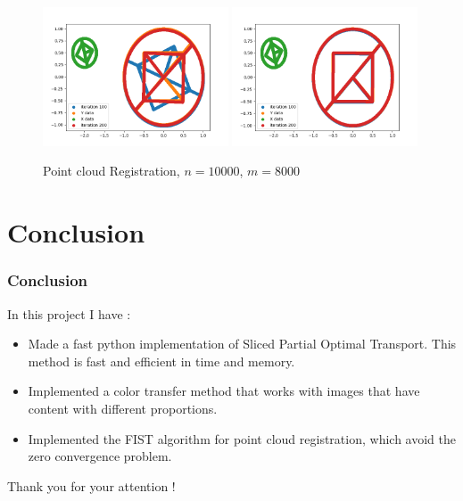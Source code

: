 \documentclass[11pt]{beamer}
\begin{document}
\begin{frame}
\begin{figure}[H]
\centering
\includegraphics[width=0.49\textwidth, trim = 0cm 1cm 0cm 0cm]{circle_shape.png}
\includegraphics[width=0.49\textwidth, trim = 0cm 1cm 0cm 0cm]{circle_shape2.png}
\caption{Point cloud Registration, $n=10000$, $m=8000$}\label{cc_shape}
\end{figure}
\end{frame}

\section*{Conclusion}

\begin{frame}
\frametitle{Conclusion}
In this project I have :
\begin{itemize}
\item Made a {\color{red}fast python implementation of Sliced Partial Optimal Transport}. This method is fast and efficient in time and memory. 
\item Implemented a {\color{red}color transfer method} that works with images that have content with different proportions.
\item Implemented the {\color{red}FIST algorithm} for point cloud registration, which avoid the zero convergence problem.
\end{itemize}
\end{frame}

\begin{frame}
Thank you for your attention !
\end{frame}
\end{document}
